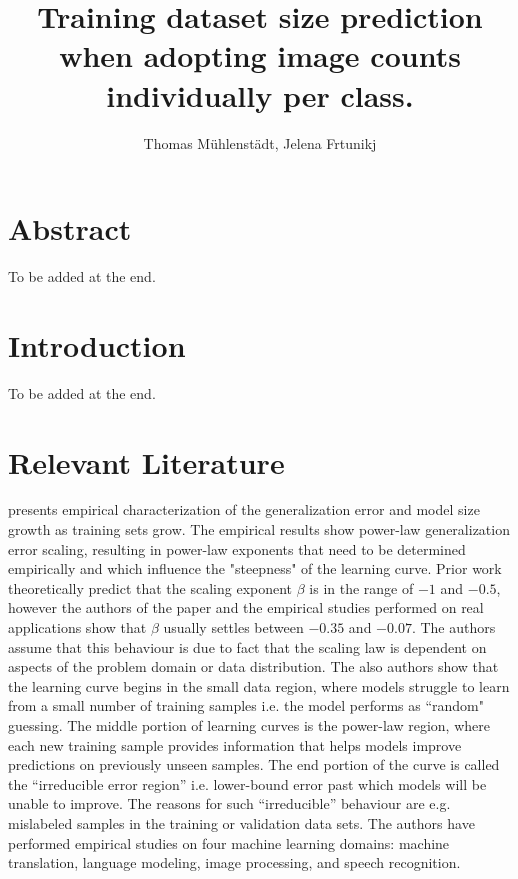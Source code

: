 \documentclass{article} %
\title{Training dataset size prediction when adopting image counts individually per class.}
\author{Thomas Mühlenstädt, Jelena Frtunikj}
\begin{document}
\maketitle

\section*{Abstract}

To be added at the end.

\section{Introduction}

To be added at the end.


\section{Relevant Literature}

\cite{hestness2017deep} presents empirical characterization of the generalization error and model size growth as training sets grow.  The empirical results show power-law generalization error scaling, resulting in power-law exponents that need to be determined empirically and which influence the "steepness" of the learning curve. Prior work theoretically predict that the scaling exponent $\beta$ is in the range of $-1$ and $-0.5$, however the authors of the paper and the empirical studies performed on real applications show that $\beta$ usually settles between $-0.35$ and $-0.07$. The authors assume that this behaviour is due to fact that the scaling law is dependent on aspects of the problem domain or data distribution. The also authors show that the learning curve begins in the small data region, where models struggle to learn from a small number of training samples i.e. the model performs as “random" guessing. The middle portion of learning curves is the power-law region, where each new training sample provides information that helps models improve predictions on previously unseen samples. The end portion of the curve is called the “irreducible error region” i.e. lower-bound error past which models will be unable to improve. The reasons for such “irreducible” behaviour are e.g. mislabeled samples in the training or validation data sets. The authors have performed empirical studies on four machine learning domains: machine translation, language modeling, image processing, and speech recognition.
\end{document}
